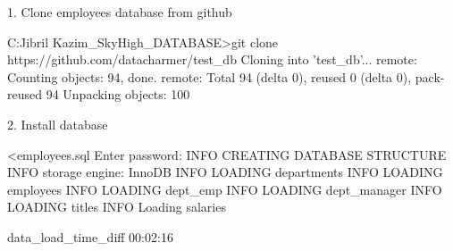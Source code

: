 1. Clone employees database from github

C:\Users\Muhd Jibril Kazim\Documents\_SkyHigh\_DATABASE>git clone https://github.com/datacharmer/test_db
Cloning into 'test_db'...
remote: Counting objects: 94, done.
remote: Total 94 (delta 0), reused 0 (delta 0), pack-reused 94
Unpacking objects: 100%

2. Install database

 <employees.sql
Enter password:
INFO
CREATING DATABASE STRUCTURE
INFO
storage engine: InnoDB
INFO
LOADING departments
INFO
LOADING employees
INFO
LOADING dept_emp
INFO
LOADING dept_manager
INFO
LOADING titles
INFO
Loading salaries

data_load_time_diff
00:02:16



